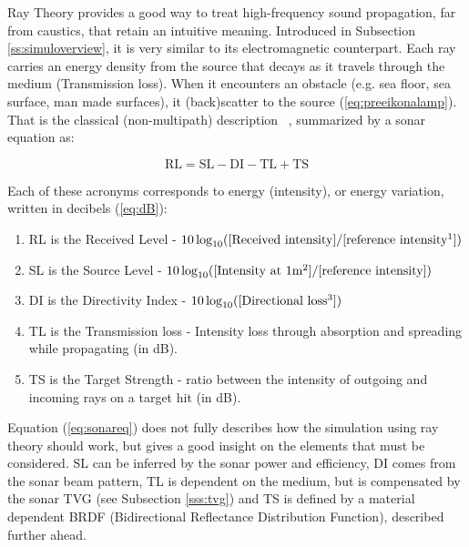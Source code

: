 Ray Theory provides a good way to treat high-frequency sound propagation,
far from caustics, that retain an intuitive meaning. Introduced in Subsection
\ref{ss:simuloverview}, it is very similar to its electromagnetic counterpart.
Each ray carries an energy density from the source that decays as it travels
through the medium (Transmission loss). When it encounters an obstacle (e.g. sea floor, sea
surface, man made surfaces), it (back)scatter to the source
(\ref{eq:preeikonalamp}). That is the
classical (non-multipath) description
~\cite{LURTON,Etter2013,miller2015real,bell1997application}, summarized by a
sonar equation as:

\begin{equation}
\label{eq:sonareq}
\text{RL} = \text{SL} - \text{DI} - \text{TL} + \text{TS}
\end{equation}

Each of these acronyms corresponds to energy (intensity), or energy variation,
written in decibels (\ref{eq:dB}):
\begin{enumerate}
  \item RL is the Received Level - $10\log_{10}([\text{Received
  intensity}]/[\text{reference intensity\footnotemark}])$
  \item SL is the Source Level - $10\log_{10}([\text{Intensity at
  1m\footnotemark}]/[\text{reference
  intensity}])$
  \item DI is the Directivity Index - $10\log_{10}([\text{Directional
  loss\footnotemark}])$
  \item TL is the Transmission loss - Intensity loss through absorption and
  spreading while propagating (in dB).
  \item TS is the Target Strength - ratio between the intensity of outgoing
  and incoming rays on a target hit (in dB).
\end{enumerate}



Equation (\ref{eq:sonareq}) does not fully describes how the simulation
using ray theory should work, but gives a good insight on the elements that must
be considered. SL can be inferred by the sonar power and efficiency, DI comes
from the sonar beam pattern, TL is dependent on the medium, but is compensated
by the sonar TVG (see Subsection \ref{sss:tvg}) and TS is defined by a material
dependent BRDF (Bidirectional Reflectance
Distribution Function), described further ahead.

